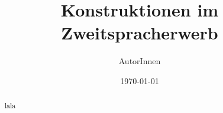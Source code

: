 \documentclass{scrartcl}
\title{Konstruktionen im Zweitspracherwerb}
\author{AutorInnen}
\date{\today}
\begin{document}
\maketitle

\begin{abstract}
    lala
\end{abstract}










\nocite{*}



\end{document}
